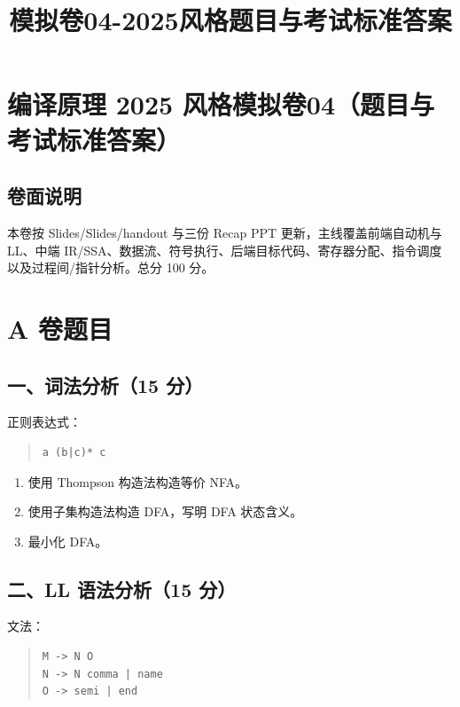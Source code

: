 \documentclass[UTF8,zihao=-4]{ctexart}
\title{模拟卷04-2025风格题目与考试标准答案}
\author{}
\date{}
\begin{document}
\maketitle
\setcounter{tocdepth}{1}
\tableofcontents
\newpage
\section{编译原理 2025 风格模拟卷04（题目与考试标准答案）}


\subsection{卷面说明}


本卷按 Slides/Slides/handout 与三份 Recap PPT 更新，主线覆盖前端自动机与 LL、中端 IR/SSA、数据流、符号执行、后端目标代码、寄存器分配、指令调度以及过程间/指针分析。总分 100 分。


\section{A 卷题目}


\subsection{一、词法分析（15 分）}


正则表达式：


\begin{quote}
\footnotesize
\begin{verbatim}
a (b|c)* c
\end{verbatim}
\end{quote}


\begin{enumerate}
\item 使用 Thompson 构造法构造等价 NFA。
\item 使用子集构造法构造 DFA，写明 DFA 状态含义。
\item 最小化 DFA。
\end{enumerate}


\subsection{二、LL 语法分析（15 分）}


文法：


\begin{quote}
\footnotesize
\begin{verbatim}
M -> N O
N -> N comma | name
O -> semi | end
\end{verbatim}
\end{quote}
\end{document}
